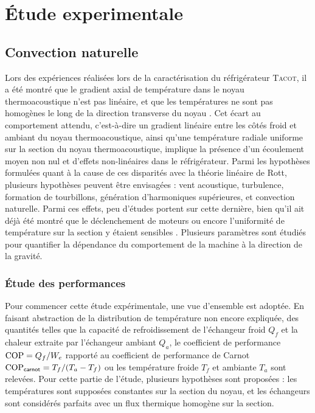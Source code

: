 \chapter{\'Etude experimentale}\label{chap:EtudeExpe}
\mylocaltoc

\section{Convection naturelle}\label{chap:EtudeExpe_ConvNat}
Lors des expériences réalisées lors de la caractérisation du réfrigérateur \textsc{Tacot}, il a été montré que le gradient axial de température dans le noyau thermoacoustique n'est pas linéaire, et que les températures ne sont pas homogènes le long de la direction transverse du noyau \cite{ramadan_design_2021}. Cet écart au comportement attendu, c'est-à-dire un gradient linéaire entre les côtés froid et ambiant du noyau thermoacoustique, ainsi qu'une température radiale uniforme sur la section du noyau thermoacoustique, implique la présence d'un écoulement moyen non nul et d'effets non-linéaires dans le réfrigérateur. Parmi les hypothèses formulées quant à la cause de ces disparités avec la théorie linéaire de Rott, plusieurs hypothèses peuvent être envisagées : vent acoustique, turbulence, formation de tourbillons, génération d'harmoniques supérieures, et convection naturelle. Parmi ces effets, peu d'études portent sur cette dernière, bien qu'il ait déjà été montré que le déclenchement de moteurs ou encore l'uniformité de température sur la section y étaient sensibles \cite{ross_influence_2003,  hireche_numerical_2019, ramadan_experimental_2018,  zhang_novel_2011}. Plusieurs paramètres sont étudiés pour quantifier la dépendance du comportement de la machine à la direction de la gravité. 

\subsection{\'Etude des performances}
Pour commencer cette étude expérimentale, une vue d'ensemble est adoptée. En faisant abstraction de la distribution de température non encore expliquée, des quantités telles que la capacité de refroidissement de l'échangeur froid $Q_f$ et la chaleur extraite par l'échangeur ambiant $Q_a$, le coefficient de performance $\mathrm{COP}=Q_f/W_e$ rapporté au coefficient de performance de Carnot $\mathrm{COP}_{\sf carnot} = T_f/(T_a-T_f)$ ou les température froide $T_f$ et ambiante $T_a$ sont relevées. Pour cette partie de l'étude, plusieurs hypothèses sont proposées : les températures sont supposées constantes sur la section du noyau, et les échangeurs sont considérés parfaits avec un flux thermique homogène sur la section. 

